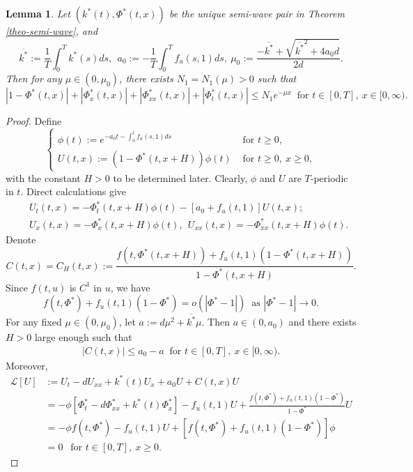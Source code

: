 \documentclass[11pt]{amsart}
\newtheorem{lemma}[theorem]{Lemma}
\numberwithin{equation}{section}
\begin{document}
\begin{lemma}\label{lem-1-phi}
 Let $(k^*(t),\Phi^*(t,x))$ be the unique semi-wave pair in Theorem \ref{theo-semi-wave}, and
  \[ \overline{k^*}:=\frac{1}{T}\int_0^Tk^*(s)ds,~~a_0:=-\frac{1}{T}\int_0^Tf_u(s,1)ds,\ \mu_0:=\frac{-\overline{k^*}+\sqrt{\overline{k^*}^2+4a_0d}}{2d}.\]
  Then for any $\mu\in (0,\mu_0)$, there exists $N_1=N_1(\mu)>0$ such that
  \begin{equation}\label{phi-infty}
    |1-\Phi^*(t,x)|+|\Phi_x^*(t,x)|+|\Phi_{xx}^*(t,x)|+|\Phi_t^*(t,x)|\leq N_1 e^{-\mu x} ~\text{  for  }t\in[0,T],~x\in[0,\infty).
  \end{equation}
 
\end{lemma}
\begin{proof}
Define
\[
\begin{cases}
\phi(t):=e^{-a_0t-\int_0^tf_u(s,1)ds} &\text{ for }t\geq0,\\
U(t,x):=(1-\Phi^*(t,x+H))\phi(t)&\text{ for } t\geq 0,\ x\geq 0,
\end{cases}\]
with the constant $H>0$  to be determined later.  Clearly, $\phi$ and $U$ are $T$-periodic in $t$. 
Direct calculations give 
\begin{eqnarray*}
  &&U_t(t,x)=-\Phi^*_t(t,x+H)\phi(t)-[a_0+f_u(t,1)]U(t,x);\\
  &&U_x(t,x)=-\Phi^*_x(t,x+H)\phi(t), ~~U_{xx}(t,x)=-\Phi^*_{xx}(t,x+H)\phi(t).
\end{eqnarray*}
Denote 
\[C(t,x)=C_H(t,x):=\frac{f(t,\Phi^*(t,x+H))+f_u(t,1)(1-\Phi^*(t,x+H))}{1-\Phi^*(t,x+H)}.\]
Since $f(t,u)$ is $C^1$ in $u$, we have  
\begin{equation*}
  f(t,\Phi^*)+f_u(t,1)(1-\Phi^*)=o(|\Phi^*-1|) \ \text{ as } |\Phi^*-1|\to 0.
\end{equation*}
For any fixed $\mu\in(0,\mu_0)$, let $a:=d\mu^2+\overline{k^*}\mu$.
Then  $a\in(0,a_0)$  and there exists $H>0$ large enough such that  
\begin{eqnarray*}
  |C(t,x)|\leq a_0-a \ \text{ for }t\in[0,T],\ x\in[0,\infty).
\end{eqnarray*}
Moreover, 
\begin{equation}\label{eq-Lu}\begin{aligned}
  \mathcal{L}[U]&:=U_t-dU_{xx}+k^*(t)U_x+a_0 U+C(t,x)U \\
  &= -\phi[\Phi^*_t-d\Phi^*_{xx}+k^*(t)\Phi^*_x]-f_u(t,1)U+\frac{f(t,\Phi^*)+f_u(t,1)(1-\Phi^*)}{1-\Phi^*}U  \\
  &= -\phi f(t,\Phi^*)-f_u(t,1)U+[f(t,\Phi^*)+f_u(t,1)(1-\Phi^*)]\phi\\
  &=0\ \  \mbox{ for } t\in [0, T],\ x\geq 0.
  \end{aligned}
\end{equation}


\end{proof}
\end{document}
